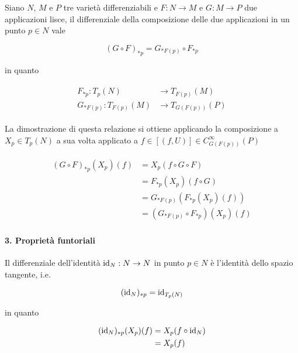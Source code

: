 Siano $ N $, $ M $ e $ P $ tre varietà differenziabili e $ F : N \to M $ e $ G : M \to P $ due applicazioni lisce, il differenziale della composizione delle due applicazioni in un punto $ p \in N $ vale

\begin{equation}
	(G \circ F)_{*p} = G_{*F(p)} \circ F_{*p}
\end{equation}

in quanto

\begin{align}
	\begin{split}
		F_{*p} : T_{p}(N) &\to T_{F(p)}(M)\\
		G_{*F(p)} : T_{F(p)}(M) &\to T_{G(F(p))}(P)
	\end{split}
\end{align}

La dimostrazione di questa relazione si ottiene applicando la composizione a $ X_{p} \in T_{p}(N) $ a sua volta applicato a $ f \in [(f,U)] \in C_{G(F(p))}^{\infty}(P) $

\begin{align}
	\begin{split}
		(G \circ F)_{*p} (X_{p})(f) &= X_{p} (f \circ G \circ F)\\
		&= F_{*p} (X_{p}) (f \circ G)\\
		&= G_{*F(p)} (F_{*p} (X_{p})(f))\\
		&= (G_{*F(p)} \circ F_{*p})(X_{p})(f)
	\end{split}
\end{align}

\paragraph{3. Proprietà funtoriali}

Il differenziale dell'identità $ \operatorname{id}_{N} : N \to N $ in punto $ p \in N $ è l'identità dello spazio tangente, i.e.
	
\begin{equation}
	(\operatorname{id}_{N})_{*p} = \operatorname{id}_{T_{p}(N)}
\end{equation}

in quanto

\begin{align}
	\begin{split}
		(\operatorname{id}_{N})_{*p} (X_{p})(f) &= X_{p} (f \circ \operatorname{id}_{N})\\
		&= X_{p}(f)
	\end{split}
\end{align}

